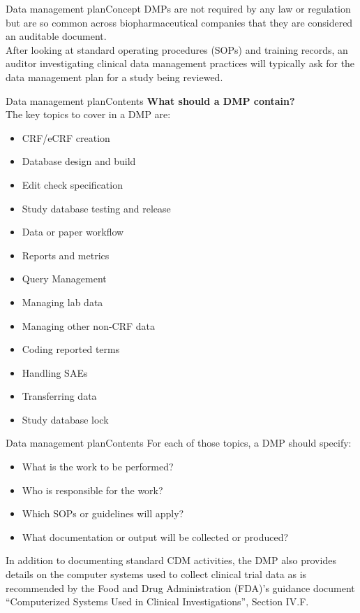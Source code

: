 \documentclass[xcolor=dvipsnames,11pt]{beamer}
\begin{document}
\begin{frame}[fragile]{Data management plan}{Concept}
	DMPs are not required by any law or regulation but are so common across biopharmaceutical companies that they are considered an auditable document.\\
	\bigskip
	After looking at standard operating procedures (SOPs) and training records, an auditor investigating clinical data management practices will typically ask for the data management plan for a study being reviewed.	
\end{frame}

\begin{frame}[fragile]{Data management plan}{Contents}
	\textbf{What should a DMP contain?}\\
	The key topics to cover in a DMP are:
	\begin{itemize}
		\item CRF/eCRF creation
		\item Database design and build
		\item Edit check specification
		\item Study database testing and release
		\item Data or paper workflow
		\item Reports and metrics
		\item Query Management
		\item Managing lab data
		\item Managing other non-CRF data
		\item Coding reported terms
		\item Handling SAEs
		\item Transferring data
		\item Study database lock
	\end{itemize}
\end{frame}

\begin{frame}[fragile]{Data management plan}{Contents}
	For each of those topics, a DMP should specify:
	\begin{itemize}
		\item What is the work to be performed?
		\item Who is responsible for the work?
		\item Which SOPs or guidelines will apply?
		\item What documentation or output will be collected or produced?
	\end{itemize}
	In addition to documenting standard CDM activities, the DMP also provides details on the computer systems used to collect clinical trial data as is recommended by the Food and Drug Administration (FDA)’s guidance document “Computerized Systems Used in Clinical Investigations”, Section IV.F.
\end{frame}
\end{document}
